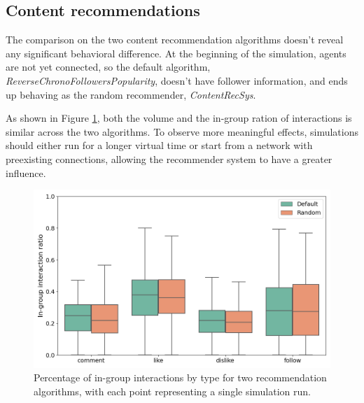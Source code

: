 \subsection{Content recommendations}
The comparison on the two content recommendation algorithms doesn't reveal any significant behavioral difference.
At the beginning of the simulation, agents are not yet connected, so the default algorithm, \textit{ReverseChronoFollowersPopularity}, doesn't have follower information, and ends up behaving as the random recommender, \textit{ContentRecSys}.

As shown in Figure \ref{fig:recsys_comparison}, both the volume and the in-group ration of interactions is similar across the two algorithms.
To observe more meaningful effects, simulations should either run for a longer virtual time or start from a network with preexisting connections, allowing the recommender system to have a greater influence.


\begin{figure}[h]
    \centering
    \includegraphics[width=1\linewidth]{Images/Recsys/recsys_in_group_ratio.png}
    \caption{Percentage of in-group interactions by type for two recommendation algorithms, with each point representing a single simulation run.}
    \label{fig:recsys_comparison}
\end{figure}